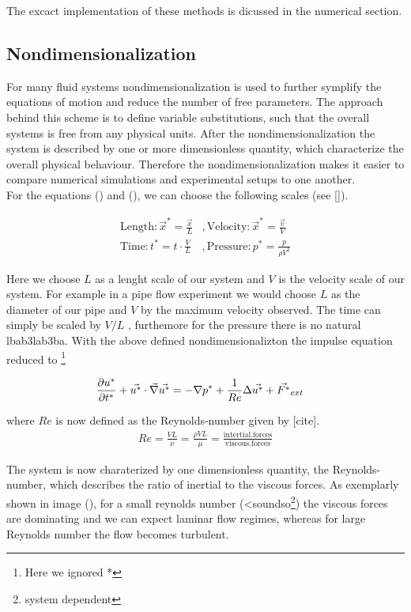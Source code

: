 The excact implementation of these methods is dicussed in the numerical section.

\subsection{Nondimensionalization}

For many fluid systems nondimensionalization is used to further symplify the equations of motion and reduce the number of free parameters.
The approach behind this scheme is to define variable substitutions, such that the overall systems is free from any physical units.
After the nondimensionalization the system is described by one or more dimensionless quantity, which characterize the overall physical behaviour.
Therefore the nondimensionalization makes it easier to compare numerical simulations and experimental setups to one another.\\
For the equations () and (), we can choose the following scales (see []).

\begin{align}
    \mathrm{Length}  : \vec{x}^* = \frac{\vec{x}}{L}  &, \mathrm{Velocity}: \vec{x}^* = \frac{\vec{v}}{V}\\
    \mathrm{Time}    : t^* = t \cdot \frac{V}{L}      &, \mathrm{Pressure}: p^* = \frac{p}{\rho V^2}
\end{align}

Here we choose $L$ as a lenght scale of our system and $V$ is the velocity scale of our system.
For example in a pipe flow experiment we would choose $L$ as the diameter of our pipe and $V$ by the maximum velocity observed.
The time can simply be scaled  by $V/L$ , furthemore for the pressure there is no natural lbab3lab3ba.
With the above defined nondimensionalizton the impulse equation reduced to \footnote{Here we ignored *}

\begin{align}
    \pdn[u^*]{t^*} + \vec{u^*} \cdot \vec{\nabla} \vec{u^*} &= -\nabla p^* + \frac{1}{Re} \Delta \vec{u^*} + \vec{F^*}_{ext}
\end{align}

where $Re$ is now defined as the Reynolds-number given by [cite].
\begin{align}
    Re = \frac{VL}{\nu} = \frac{\rho VL}{\mu} = \frac{\mathrm{intertial.forces}}{\mathrm{viscous.forces}}
\end{align}

The system is now charaterized by one dimensionless quantity, the Reynolds-number, which describes the ratio of inertial to the viscous forces.
As exemplarly shown in image (),  for a small reynolds number (<soundso\footnote{system dependent})  the viscous forces are dominating and we can expect laminar flow regimes, whereas for
large Reynolds number the flow becomes turbulent.

